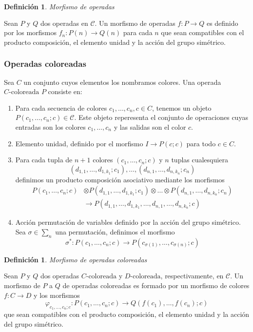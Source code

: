 \documentclass[11pt,a4paper,openright,oneside]{article}
\numberwithin{equation}{section}
\newtheorem{defi}[teo]{Definici\'on}
\theoremstyle{definition}
\begin{document}
\begin{defi}
    Morfismo de operadas
\end{defi}
Sean $P$ y $Q$ dos operadas en $\mathcal{C}$. Un morfismo de operadas $f: P \longrightarrow Q$ es definido por los morfismos $f_n: P(n)\longrightarrow Q(n)$ para cada $n$
que sean compatibles con el producto composici\'on, el elemento unidad y la acci\'on del grupo sim\'etrico.


\subsubsection{Operadas coloreadas}
Sea $C$ un conjunto cuyos elementos los nombramos colores. Una operada $C\text{-coloreada}$ $P$ consiste en:
\begin{enumerate}[(1)]
    \item Para cada secuencia de colores $c_1,\dots,c_n,c\in C$, tenemos un objeto $P(c_1,\dots,c_n;c)\in\mathcal{C}$.
          Este objeto reperesenta el conjunto de operaciones cuyas entradas son los colores $c_1,\dots,c_n$ y las salidas son el color $c$.
    \item Elemento unidad, definido por el morfismo $I \longrightarrow P(c;c)$ para todo $c\in C$.
    \item Para cada tupla de $n+1$ colores $(c_1,\dots,c_n;c)$ y $n$ tuplas cualesquiera
          $$
              (d_{1,1},\dots,d_{1,k_1};c_1),\dots,(d_{n,1},\dots,d_{n,k_n};c_n)
          $$
          definimos un producto composici\'on asociativo mediante los morfismos
          \begin{align*}
              P(c_1,\dots,c_n;c) & \otimes P(d_{1,1},\dots,d_{1,k_1};c_1) \otimes\dots\otimes P(d_{n,1},\dots,d_{n,k_n};c_n) \\
                                 & \longrightarrow P(d_{1,1},\dots,d_{1,k_1},\dots,d_{n,1},\dots,d_{n,k_n};c)
          \end{align*}
    \item Acci\'on permutaci\'on de variables definido por la acci\'on del grupo sim\'etrico. Sea $\sigma\in\sum_n$ una permutaci\'on, definimos el morfismo
          $$
              \sigma^{*}: P(c_1,\dots,c_n;c) \longrightarrow P(c_{\sigma(1)},\dots,c_{\sigma(n)};c)
          $$
\end{enumerate}

\begin{defi}
    Morfismo de operadas coloreadas
\end{defi}
Sean $P$ y $Q$ dos operadas $C\text{-coloreada}$ y $D\text{-coloreada}$, respectivamente, en $\mathcal{C}$. Un morfismo de $P$ a $Q$ de operadas coloreadas es formado
por un morfismo de colores $f: C \longrightarrow D$ y los morfismos
$$
    \varphi_{c_1,\dots,c_n;c}: P(c_1,\dots,c_n;c) \longrightarrow Q(f(c_1),\dots,f(c_n);c)
$$
que sean compatibles con el producto composici\'on, el elemento unidad y la acci\'on del grupo sim\'etrico.
\end{document}
